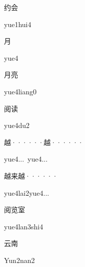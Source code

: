 \begin{multicols*}{2}
\begin{verbete}{约会}
\begin{pronuncia}{yue1hui4}
\end{pronuncia}
\end{verbete}

\begin{verbete}[yue4]{月}
\begin{pronuncia}{yue4}
\end{pronuncia}
\end{verbete}

\begin{verbete}{月亮}
\begin{pronuncia}{yue4liang0}
\end{pronuncia}
\end{verbete}

\begin{verbete}[yue4du2]{阅读}
\begin{pronuncia}{yue4du2}
\end{pronuncia}
\end{verbete}

\begin{verbete}{越······越······}
\begin{pronuncia}[\\]{yue4...\ yue4...}
\end{pronuncia}
\end{verbete}

\begin{verbete}{越来越······}
\begin{pronuncia}{yue4lai2yue4...}
\end{pronuncia}
\end{verbete}

\begin{verbete}{阅览室}
\begin{pronuncia}{yue4lan3shi4}
\end{pronuncia}
\end{verbete}

\begin{verbete}{云南}
\begin{pronuncia}{Yun2nan2}
\end{pronuncia}
\end{verbete}


\end{multicols*}

